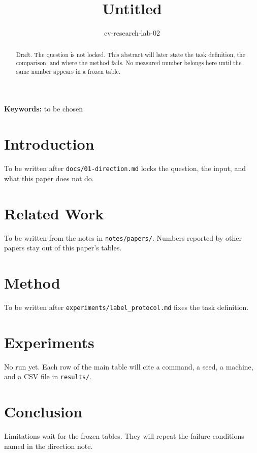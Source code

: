 \documentclass[10pt]{article}
\title{Untitled}
\author{cv-research-lab-02}
\date{}
\begin{document}
\maketitle

\begin{abstract}
Draft. The question is not locked. This abstract will later state the task definition, the comparison, and where the method fails. No measured number belongs here until the same number appears in a frozen table.
\end{abstract}

\noindent\textbf{Keywords:} to be chosen

\section{Introduction}
To be written after \texttt{docs/01-direction.md} locks the question, the input, and what this paper does not do.

\section{Related Work}
To be written from the notes in \texttt{notes/papers/}. Numbers reported by other papers stay out of this paper's tables.

\section{Method}
To be written after \texttt{experiments/label\_protocol.md} fixes the task definition.

\section{Experiments}
No run yet. Each row of the main table will cite a command, a seed, a machine, and a CSV file in \texttt{results/}.

\section{Conclusion}
Limitations wait for the frozen tables. They will repeat the failure conditions named in the direction note.
\end{document}
